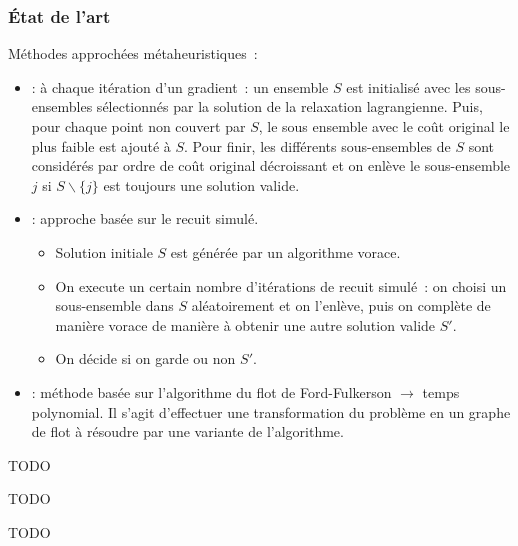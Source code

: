 \documentclass[aspectratio=169,11pt]{beamer}
\begin{document}
	\begin{frame}
		\frametitle{État de l'art}
		Méthodes approchées métaheuristiques~:
		\begin{itemize}
			\item \citeauthor{Beasley1990}: à chaque itération d'un gradient~: un ensemble \(S\) est initialisé avec les sous-ensembles sélectionnés par la solution de la relaxation lagrangienne. Puis, pour chaque point non couvert par \(S\), le sous ensemble avec le coût original le plus faible est ajouté à \(S\). Pour finir, les différents sous-ensembles de \(S\) sont considérés par ordre de coût original décroissant et on enlève le sous-ensemble \(j\) si \(S \backslash \{j\}\) est toujours une solution valide.~\cite{Beasley1990}	
			\item \citeauthor{jacobs1995lsh}: approche basée sur le recuit simulé.~\cite{jacobs1995lsh}
				\begin{itemize}
					\item Solution initiale \(S\) est générée par un algorithme vorace.
					\item On execute un certain nombre d'itérations de recuit simulé~:
					on choisi un sous-ensemble dans \(S\) aléatoirement
					et on l'enlève, puis on complète de manière vorace de manière à obtenir une autre solution valide \(S'\).
					\item On décide si on garde ou non \(S'\).
				\end{itemize}
			\item \citeauthor{Afif1995}: méthode basée sur l'algorithme du flot de Ford-Fulkerson \(\rightarrow\) temps polynomial. Il s'agit d'effectuer une transformation du problème en un graphe de flot à résoudre par une variante de l'algorithme.~\cite{Afif1995}
		\end{itemize}
	\end{frame}


	\begin{frame}
		\centering TODO
	\end{frame}


	\begin{frame}
		\centering TODO
	\end{frame}


	\begin{frame}
		\centering TODO
	\end{frame}
\end{document}
